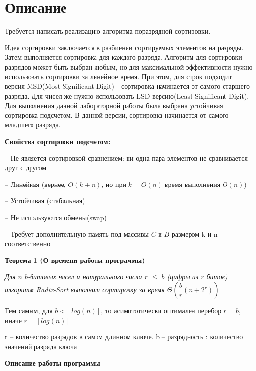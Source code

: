 \section{Описание}

Требуется написать реализацию алгоритма поразрядной сортировки.


Идея сортировки заключается в разбиении сортируемых элементов на разряды. Затем выполняется сортировка для каждого разряда. Алгоритм для сортировки разрядов может быть выбран любым, но для максимальной эффективности нужно использовать сортировки за линейное время. При этом, для строк подходит версия MSD(Most Significant Digit) - сортировка начинается от самого старшего разряда. Для чисел же нужно использовать LSD-версию(Least Significant Digit). Для выполнения данной лабораторной работы была выбрана устойчивая сортировка подсчетом. В данной версии, сортировка начинается от самого младшего разряда.

{\bf Свойства сортировки подсчетом:}

	-- Не является сортировкой сравнением: ни одна пара
элементов не сравнивается друг с другом

	-- Линейная (вернее, $O(k + n)$, но при $k = O(n)$ время
выполнения $O(n)$)

	-- Устойчивая (стабильная)
	
	-- Не используются обмены(swap)
	
	-- Требует дополнительную память под массивы $C$ и $B$
размером k и n соответственно

\textbf{Теорема 1 (О времени работы программы)}

\textit{ Для $n$ $b$-битовых чисел и натурального числа $r$ $\leq$ $b$ (цифры из
$r$ битов) алгоритм Radix-Sort выполнит сортировку за время $\Theta(\dfrac{b}{r}(n + 2 ^r))$}


Тем самым, для $b < [log(n)]$, то асимптотически оптимален перебор $r = b$, иначе $r = [log(n)]$

r -- количество разрядов в самом длинном ключе.
b -- разрядность : количество значений разряда ключа

{\bf Описание работы программы}


